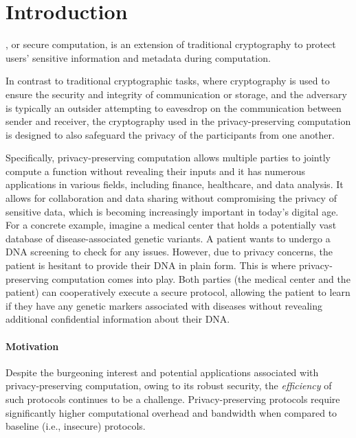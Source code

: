 \chapter{Introduction}
\label{introduction}

, or secure computation,
is an extension of traditional cryptography to protect users' sensitive information and metadata during computation.

In contrast to traditional cryptographic tasks, where cryptography is used to ensure the security and integrity of communication or storage, and the adversary is typically an outsider attempting to eavesdrop on the communication between sender and receiver, the cryptography used in the privacy-preserving computation is designed to also safeguard the privacy of the participants from one another.

Specifically, privacy-preserving computation allows multiple parties to jointly compute a function without revealing their inputs and it has numerous applications in various fields, including finance, healthcare, and data analysis. It allows for collaboration and data sharing without compromising the privacy of sensitive data, which is becoming increasingly important in today's digital age.
For a concrete example, imagine a medical center that holds a potentially vast database of disease-associated genetic variants. A patient wants to undergo a DNA screening to check for any issues. However, due to privacy concerns, the patient is hesitant to provide their DNA in plain form. This is where privacy-preserving computation comes into play. Both parties (the medical center and the patient) can cooperatively execute a secure protocol, allowing the patient to learn if they have any genetic markers associated with diseases without revealing additional confidential information about their DNA.

\subsubsection{Motivation}

Despite the burgeoning interest and potential applications associated with privacy-preserving computation, owing to its robust security, the \emph{efficiency} of such protocols continues to be a challenge. Privacy-preserving protocols require significantly higher computational overhead and bandwidth when compared to baseline (i.e., insecure) protocols.

